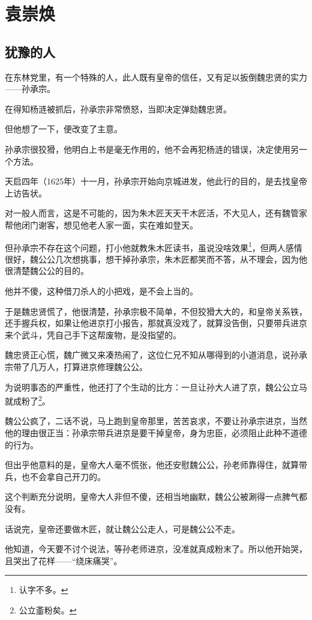 \section{袁崇焕}
\ifnum{}
	\begin{multicols}{\theparacolNo}
		\fi
		\subsection{犹豫的人}
		在东林党里，有一个特殊的人，此人既有皇帝的信任，又有足以扳倒魏忠贤的实力——孙承宗。

		在得知杨涟被抓后，孙承宗非常愤怒，当即决定弹劾魏忠贤。

		但他想了一下，便改变了主意。

		孙承宗很狡猾，他明白上书是毫无作用的，他不会再犯杨涟的错误，决定使用另一个方法。

		天启四年（1625年）十一月，孙承宗开始向京城进发，他此行的目的，是去找皇帝上访告状。

		对一般人而言，这是不可能的，因为朱木匠天天干木匠活，不大见人，还有魏管家帮他闭门谢客，想见他老人家一面，实在难如登天。

		但孙承宗不存在这个问题，打小他就教朱木匠读书，虽说没啥效果\footnote{认字不多。}，但两人感情很好，魏公公几次想挑事，想干掉孙承宗，朱木匠都笑而不答，从不理会，因为他很清楚魏公公的目的。

		他并不傻，这种借刀杀人的小把戏，是不会上当的。

		于是魏忠贤慌了，他很清楚，孙承宗极不简单，不但狡猾大大的，和皇帝关系铁，还手握兵权，如果让他进京打小报告，那就真没戏了，就算没告倒，只要带兵进京来个武斗，凭自己手下这帮废物，是没指望的。

		魏忠贤正心慌，魏广微又来凑热闹了，这位仁兄不知从哪得到的小道消息，说孙承宗带了几万人，打算进京修理魏公公。

		为说明事态的严重性，他还打了个生动的比方：一旦让孙大人进了京，魏公公立马就成粉了\footnote{公立齑粉矣。}。

		魏公公疯了，二话不说，马上跑到皇帝那里，苦苦哀求，不要让孙承宗进京，当然他的理由很正当：孙承宗带兵进京是要干掉皇帝，身为忠臣，必须阻止此种不道德的行为。

		但出乎他意料的是，皇帝大人毫不慌张，他还安慰魏公公，孙老师靠得住，就算带兵，也不会拿自己开刀的。

		这个判断充分说明，皇帝大人非但不傻，还相当地幽默，魏公公被涮得一点脾气都没有。

		话说完，皇帝还要做木匠，就让魏公公走人，可是魏公公不走。

		他知道，今天要不讨个说法，等孙老师进京，没准就真成粉末了。所以他开始哭，且哭出了花样——“绕床痛哭”。


\end{multicols}
